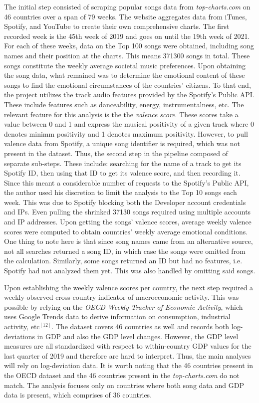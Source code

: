 \documentclass[12pt]{article}
\begin{document}
The initial step consisted of scraping popular songs data from \textit{top-charts.com} on 46 countries over a span of 79 weeks. The website aggregates data from iTunes, Spotify, and YouTube to create their own comprehensive charts. The first recorded week is the 45th week of 2019 and goes on until the 19th week of 2021. For each of these weeks, data on the Top 100 songs were obtained, including song names and their position at the charts. This means 371300 songs in total. These songs constitute the weekly average societal music preferences. Upon obtaining the song data, what remained was to determine the emotional content of these songs to find the emotional circumstances of the countries' citizens. To that end, the project utilizes the track audio features provided by the Spotify's Public API. These include features such as danceability, energy, instrumentalness, etc. The relevant feature for this analysis is the the \textit{valence score}. These scores take a value between 0 and 1 and express the musical positivity of a given track where 0 denotes minimm positivity and 1 denotes maximum positivity. However, to pull valence data from Spotify, a unique song identifier is required, which was not present in the dataset. Thus, the second step in the pipeline composed of separate sub-steps. These include: searching for the name of a track to get its Spotify ID, then using that ID to get its valence score, and then recording it. Since this meant a considerable number of requests to the Spotify's Public API, the author used his discretion to limit the analysis to the Top 10 songs each week. This was due to Spotify blocking both the Developer account credentials and IPs. Even pulling the shrinked 37130 songs required using multiple accounts and IP addresses. Upon getting the songs' valence scores, average weekly valence scores were computed to obtain countries' weekly average emotional conditions. One thing to note here is that since song names came from an alternative source, not all searches returned a song ID, in which case the songs were omitted from the calculation. Similarly, some songs returned an ID but had no features, i.e. Spotify had not analyzed them yet. This was also handled by omitting said songs.

Upon establishing the weekly valence scores per country, the next step required a weekly-observed cross-country indicator of macroeconomic activity. This was possible by relying on the \textit{OECD Weekly Tracker of Economic Activity}, which uses Google Trends data to derive information on consumption, industrial activity, etc$^{[12]}$. The dataset covers 46 countries as well and records both log-deviations in GDP and also the GDP level changes. However, the GDP level measures are all standardized with respect to within-country GDP values for the last quarter of 2019 and therefore are hard to interpret. Thus, the main analyses will rely on log-deviation data. It is worth noting that the 46 countries present in the OECD dataset and the 46 countries present in the \textit{top-charts.com} do not match. The analysis focuses only on countries where both song data and GDP data is present, which comprises of 36 countries. 
\end{document}
